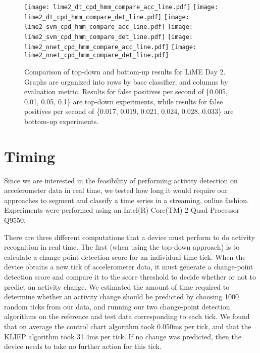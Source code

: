 \begin{figure}[h]
 \centering
 \texttt{[image: lime2\_dt\_cpd\_hmm\_compare\_acc\_line.pdf]} \hspace{1em}\vspace{1em}
 \texttt{[image: lime2\_dt\_cpd\_hmm\_compare\_det\_line.pdf]} 
 \texttt{[image: lime2\_svm\_cpd\_hmm\_compare\_acc\_line.pdf]} \hspace{1em}\vspace{1em}
 \texttt{[image: lime2\_svm\_cpd\_hmm\_compare\_det\_line.pdf]}
 \texttt{[image: lime2\_nnet\_cpd\_hmm\_compare\_acc\_line.pdf]} \hspace{1em}
 \texttt{[image: lime2\_nnet\_cpd\_hmm\_compare\_det\_line.pdf]}
 \caption{Comparison of top-down and bottom-up results for LiME Day 2.
  Graphs are organized into rows by base classifier, and columns by evaluation
  metric. Results for false positives per second of \{0.005, 0.01, 0.05, 0.1\} are
  top-down experiments, while results for false positives per second of
  \{0.017, 0.019, 0.021, 0.024, 0.028, 0.033\} are bottom-up experiments.}
 \label{fig:lime2_compare_cpd_hmm}
\end{figure}

\section{Timing}

Since we are interested in the feasibility of performing activity detection on
accelerometer data in real time, we tested how long it would require our
approaches to segment and classify a time series in a streaming, online fashion.
Experiments were performed using an Intel(R) Core(TM) 2 Quad Processor Q9550.

There are three different computations that a device must perform to do
activity recognition in real time. The first (when using the top-down approach)
is to calculate a change-point
detection score for an individual time tick. When the device obtains a new tick of
accelerometer data, it must generate a change-point detection score and compare
it to the score threshold to decide whether or not to predict an activity
change. We estimated the amount of time required to determine whether an
activity change should be predicted by choosing 1000 random ticks from our data,
and running our two change-point detection algorithms on the reference and test
data corresponding to each tick. We found that on average the control chart algorithm
took 0.050ms per tick, and that the KLIEP algorithm took 31.4ms per tick. If no change
was predicted, then the device needs to take no further action for this tick.

